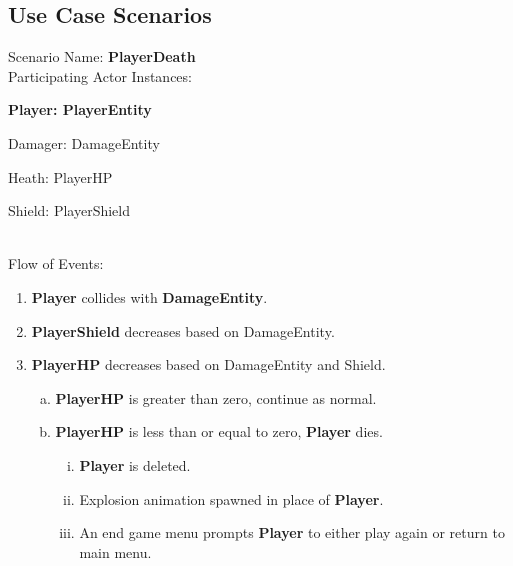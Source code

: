 \documentclass[12pt]{article}       %
\begin{document}
\subsection{Use Case Scenarios} 
Scenario Name: {\bf PlayerDeath} \\
Participating Actor Instances:        \hspace{46pt} {\bf Player: PlayerEntity

					          \hspace{2.6 in}   Damager: DamageEntity 

					          \hspace{2.6in}    Heath: PlayerHP

						\hspace{2.6in}   Shield: PlayerShield} \vspace{10pt}  \\ 
Flow of Events: 
\begin{enumerate} 
\item {\bf Player }collides with {\bf DamageEntity}.
       \item {\bf PlayerShield} decreases based on DamageEntity. 
       \item {\bf PlayerHP} decreases based on DamageEntity and Shield. 
                \begin{enumerate}[a.]
                 \item {\bf PlayerHP} is greater than zero, continue as normal.
                 \item{\bf PlayerHP} is less than or equal to zero, {\bf Player} dies.
                      \begin{enumerate}[i.]
                	\item {\bf Player} is deleted.
                	\item Explosion animation spawned in place of {\bf Player}.
		\item An end game menu prompts {\bf Player} to either play again or return to main menu.
		 \end{enumerate}
                \end{enumerate}
\end{enumerate}
\end{document}
